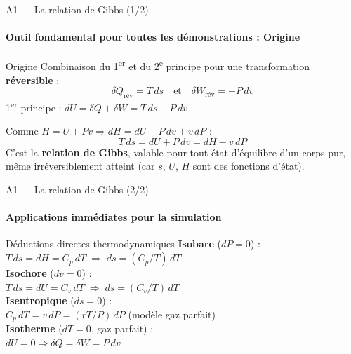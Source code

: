 \documentclass[aspectratio=43, 10pt]{beamer}
\begin{document}
\begin{frame}{A1 --- La relation de Gibbs (1/2)}
  \framesubtitle{Outil fondamental pour toutes les d\'emonstrations : Origine}

  \begin{block}{Origine}
    \normalsize
    Combinaison du 1\textsuperscript{er} et du 2\textsuperscript{e} principe
    pour une transformation \textbf{r\'eversible} :
    \[
      \delta Q_{\text{r\'ev}} = T\,ds
      \quad\text{et}\quad
      \delta W_{\text{r\'ev}} = -P\,dv
    \]
    1\textsuperscript{er} principe : $dU = \delta Q + \delta W = T\,ds - P\,dv$

    Comme $H = U + Pv \Rightarrow dH = dU + P\,dv + v\,dP$ :
    \[
      \boxed{T\,ds = dU + P\,dv = dH - v\,dP}
    \]
    C'est la \textbf{relation de Gibbs}, valable pour tout \'etat
    d'\'equilibre d'un corps pur, m\^eme irr\'eversiblement atteint
    (car $s$, $U$, $H$ sont des fonctions d'\'etat).
  \end{block}
\end{frame}

\begin{frame}{A1 --- La relation de Gibbs (2/2)}
  \framesubtitle{Applications imm\'ediates pour la simulation}

  \begin{exampleblock}{D\'eductions directes thermodynamiques}
    \normalsize
    \textbf{Isobare} ($dP=0$) :\\[2pt]
    $T\,ds = dH = C_p\,dT \;\Rightarrow\; ds = (C_p/T)\,dT$\\[8pt]
    \textbf{Isochore} ($dv=0$) :\\[2pt]
    $T\,ds = dU = C_v\,dT \;\Rightarrow\; ds = (C_v/T)\,dT$\\[8pt]
    \textbf{Isentropique} ($ds=0$) :\\[2pt]
    $C_p\,dT = v\,dP = (rT/P)\,dP$ (mod\`ele gaz parfait)\\[8pt]
    \textbf{Isotherme} ($dT=0$, gaz parfait) :\\[2pt]
    $dU = 0 \Rightarrow \delta Q = \delta W = P\,dv$
  \end{exampleblock}
\end{frame}
\end{document}
